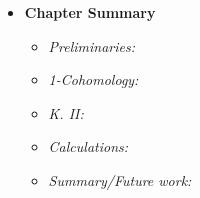 \begin{itemize}
	\item[] \textbf{Chapter Summary}
	\begin{itemize}
		\item \emph{Preliminaries:}
		\item \emph{1-Cohomology:}
		\item \emph{K. II:}
		\item \emph{Calculations:}
		\item \emph{Summary/Future work:}
	\end{itemize}
\end{itemize}

